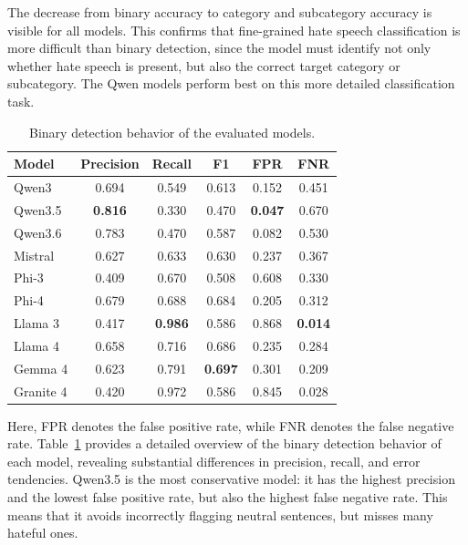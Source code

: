 \documentclass[a4paper]{article}
\begin{document}
The decrease from binary accuracy to category and subcategory accuracy is visible for all models. This confirms that fine-grained hate speech classification is more difficult than binary detection, since the model must identify not only whether hate speech is present, but also the correct target category or subcategory. The Qwen models perform best on this more detailed classification task.

\begin{table}[t]
\centering
\caption{Binary detection behavior of the evaluated models.}
\label{tab:error_analysis}
\small
\renewcommand{\arraystretch}{1.20}
\setlength{\tabcolsep}{4pt}

\begin{tabular}{lccccc}
\toprule
\textbf{Model} & \textbf{Precision} & \textbf{Recall} & \textbf{F1} & \textbf{FPR} & \textbf{FNR} \\
\midrule
Qwen3     & 0.694 & 0.549 & 0.613 & 0.152 & 0.451 \\
Qwen3.5   & \textbf{0.816} & 0.330 & 0.470 & \textbf{0.047} & 0.670 \\
Qwen3.6   & 0.783 & 0.470 & 0.587 & 0.082 & 0.530 \\
Mistral   & 0.627 & 0.633 & 0.630 & 0.237 & 0.367 \\
Phi-3     & 0.409 & 0.670 & 0.508 & 0.608 & 0.330 \\
Phi-4     & 0.679 & 0.688 & 0.684 & 0.205 & 0.312 \\
Llama 3   & 0.417 & \textbf{0.986} & 0.586 & 0.868 & \textbf{0.014} \\
Llama 4   & 0.658 & 0.716 & 0.686 & 0.235 & 0.284 \\
Gemma 4   & 0.623 & 0.791 & \textbf{0.697} & 0.301 & 0.209 \\
Granite 4 & 0.420 & 0.972 & 0.586 & 0.845 & 0.028 \\
\bottomrule
\end{tabular}

\end{table}

Here, FPR denotes the false positive rate, while FNR denotes the false negative rate. Table~\ref{tab:error_analysis} provides a detailed overview of the binary detection behavior of each model, revealing substantial differences in precision, recall, and error tendencies. Qwen3.5 is the most conservative model: it has the highest precision and the lowest false positive rate, but also the highest false negative rate. This means that it avoids incorrectly flagging neutral sentences, but misses many hateful ones.
\end{document}
